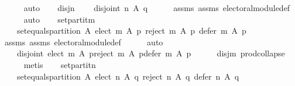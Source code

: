 \begin{isabellebody}
\ \ \ \ \isamarkupfalse%
\ auto\isanewline
\ \ \isamarkupfalse%
\ disj{\isacharunderscore}{\kern0pt}n{\isacharcolon}{\kern0pt}\isanewline
\ \ \ \ {\isachardoublequoteopen}disjoint{}\ {\isacharparenleft}{\kern0pt}n\ A\ q{\isacharparenright}{\kern0pt}{\isachardoublequoteclose}\isanewline
\ \ \ \ \isamarkupfalse%
\ assms{\isacharparenleft}{\kern0pt}{}{\isacharparenright}{\kern0pt}\ assms{\isacharparenleft}{\kern0pt}{}{\isacharparenright}{\kern0pt}\ electoral{\isacharunderscore}{\kern0pt}module{\isacharunderscore}{\kern0pt}def\isanewline
\ \ \ \ \isamarkupfalse%
\ auto\isanewline
\ \ \isamarkupfalse%
\ set{\isacharunderscore}{\kern0pt}partit{\isacharunderscore}{\kern0pt}m{\isacharcolon}{\kern0pt}\isanewline
\ \ \ \ {\isachardoublequoteopen}set{\isacharunderscore}{\kern0pt}equals{\isacharunderscore}{\kern0pt}partition\ A\ {\isacharparenleft}{\kern0pt}{\isacharparenleft}{\kern0pt}elect\ m\ A\ p{\isacharparenright}{\kern0pt}{\isacharcomma}{\kern0pt}\ {\isacharparenleft}{\kern0pt}reject\ m\ A\ p{\isacharparenright}{\kern0pt}{\isacharcomma}{\kern0pt}\ {\isacharparenleft}{\kern0pt}defer\ m\ A\ p{\isacharparenright}{\kern0pt}{\isacharparenright}{\kern0pt}{\isachardoublequoteclose}\isanewline
\ \ \ \ \isamarkupfalse%
\ assms{\isacharparenleft}{\kern0pt}{}{\isacharparenright}{\kern0pt}\ assms{\isacharparenleft}{\kern0pt}{}{\isacharparenright}{\kern0pt}\ electoral{\isacharunderscore}{\kern0pt}module{\isacharunderscore}{\kern0pt}def\isanewline
\ \ \ \ \isamarkupfalse%
\ auto\isanewline
\ \ \isamarkupfalse%
\ \isamarkupfalse%
\isanewline
\ \ \ \ {\isachardoublequoteopen}disjoint{}\ {\isacharparenleft}{\kern0pt}{\isacharparenleft}{\kern0pt}elect\ m\ A\ p{\isacharparenright}{\kern0pt}{\isacharcomma}{\kern0pt}{\isacharparenleft}{\kern0pt}reject\ m\ A\ p{\isacharparenright}{\kern0pt}{\isacharcomma}{\kern0pt}{\isacharparenleft}{\kern0pt}defer\ m\ A\ p{\isacharparenright}{\kern0pt}{\isacharparenright}{\kern0pt}{\isachardoublequoteclose}\isanewline
\ \ \ \ \isamarkupfalse%
\ disj{\isacharunderscore}{\kern0pt}m\ prod{\isachardot}{\kern0pt}collapse\isanewline
\ \ \ \ \isamarkupfalse%
\ metis\isanewline
\ \ \isamarkupfalse%
\ set{\isacharunderscore}{\kern0pt}partit{\isacharunderscore}{\kern0pt}n{\isacharcolon}{\kern0pt}\isanewline
\ \ \ \ {\isachardoublequoteopen}set{\isacharunderscore}{\kern0pt}equals{\isacharunderscore}{\kern0pt}partition\ A\ {\isacharparenleft}{\kern0pt}{\isacharparenleft}{\kern0pt}elect\ n\ A\ q{\isacharparenright}{\kern0pt}{\isacharcomma}{\kern0pt}\ {\isacharparenleft}{\kern0pt}reject\ n\ A\ q{\isacharparenright}{\kern0pt}{\isacharcomma}{\kern0pt}\ {\isacharparenleft}{\kern0pt}defer\ n\ A\ q{\isacharparenright}{\kern0pt}{\isacharparenright}{\kern0pt}{\isachardoublequoteclose}\isanewline

\end{isabellebody}
